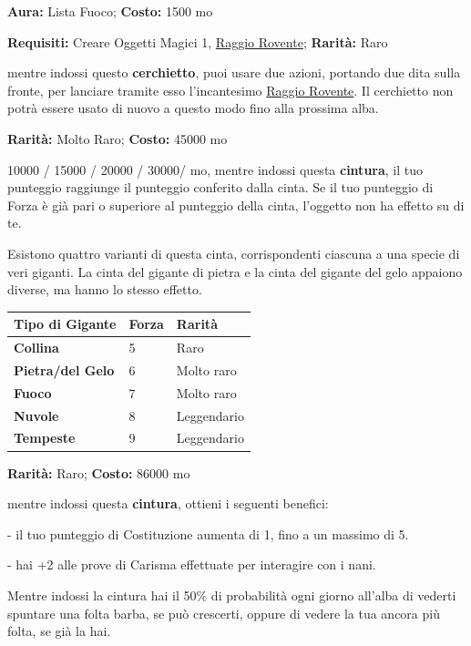 \begin{multicols}{2}

\textbf{Aura:} Lista Fuoco; \textbf{Costo:} 1500 mo

\textbf{Requisiti:} Creare Oggetti Magici 1, \hyperlink{Raggio Roventi}{Raggio Rovente}; \textbf{Rarità:} Raro

mentre indossi questo \textbf{cerchietto}, puoi usare due azioni, portando due dita sulla fronte, per lanciare tramite esso l'incantesimo \hyperlink{Raggio Rovente}{Raggio Rovente}. Il cerchietto non potrà essere usato di nuovo a questo modo fino alla prossima alba.


\textbf{Rarità:} Molto Raro; \textbf{Costo:} 45000 mo

10000 / 15000 / 20000 / 30000/ mo, mentre indossi questa \textbf{cintura}, il tuo punteggio raggiunge il punteggio conferito dalla cinta. Se il tuo punteggio di Forza è già pari o superiore al punteggio della cinta, l'oggetto non ha effetto su di te.

Esistono quattro varianti di questa cinta, corrispondenti ciascuna a una specie di veri giganti. La cinta del gigante di pietra e la cinta del gigante del gelo appaiono diverse, ma hanno lo stesso effetto.

\medskip

\noindent\begin{tabularx}{\linewidth}{lll}
	\toprule
\rowcolor{gray!20}\textbf{Tipo di Gigante}& \textbf{Forza} &\textbf{Rarità}\\
\toprule
\textbf{Collina} &5& Raro\\
\rowcolor{gray!20}\textbf{Pietra/del Gelo}& 6 &Molto raro\\
\textbf{Fuoco} &7& Molto raro\\
\rowcolor{gray!20}\textbf{Nuvole} &8& Leggendario\\
\textbf{Tempeste}& 9& Leggendario
\end{tabularx}


\textbf{Rarità:} Raro; \textbf{Costo:} 86000 mo

mentre indossi questa \textbf{cintura}, ottieni i seguenti benefici:

- il tuo punteggio di Costituzione aumenta di 1, fino a un massimo di 5.

- hai +2 alle prove di Carisma effettuate per interagire con i nani.

Mentre indossi la cintura hai il 50\% di probabilità ogni giorno all'alba di vederti spuntare una folta barba, se può crescerti, oppure di vedere la tua ancora più folta, se già la hai.


\end{multicols}
